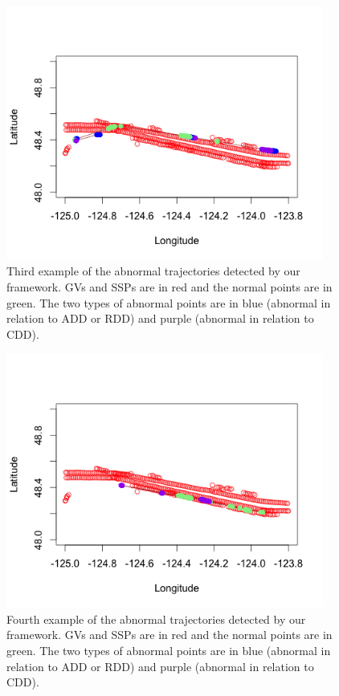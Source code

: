 \documentclass[12pt,glossary]{dalcsthesis}
\begin{document}
\begin{figure}[!hp]
\centering
\includegraphics[width=4.1in, height=3.3in]{p3.png}
\caption{Third example of the abnormal trajectories detected by our framework. GVs and SSPs are in red and the normal points are in green. The two types of abnormal points are in blue (abnormal in relation to ADD or RDD) and purple (abnormal in relation to CDD).}
\label{fig:anomalydetection_tra3}
\end{figure}

\begin{figure}[!hp]
\centering
\includegraphics[width=4.1in, height=3.3in]{p4.png}
\caption{Fourth example of the abnormal trajectories detected by our framework. GVs and SSPs are in red and the normal points are in green. The two types of abnormal points are in blue (abnormal in relation to ADD or RDD) and purple (abnormal in relation to CDD).}
\label{fig:anomalydetection_tra4}
\end{figure}
\end{document}
